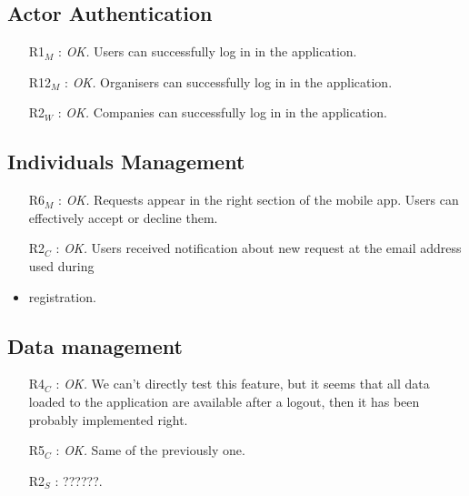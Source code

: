 \documentclass{article}
\begin{document}
\subsection{Actor Authentication}
\begin{itemize}
	\item [R1$_M$]: \textit{OK.} Users can successfully log in in the application.
	\item [R12$_M$]: \textit{OK.} Organisers can successfully log in in the application.
	\item [R2$_W$]: \textit{OK.} Companies  can successfully log in in the application.
\end{itemize}

\subsection{Individuals Management}
\begin{itemize}
	\item [R6$_M$]: \textit{OK.} Requests appear in the right section of the mobile app. Users can effectively accept or decline them.
	\item [R2$_C$]: \textit{OK.} Users received notification about new request at the email address used during 
	\item registration.
\end{itemize}

\subsection{Data management}
\begin{itemize}
	\item [R4$_C$]: \textit{OK.} We can't directly test this feature, but it seems that all data loaded to the application are available after a logout, then it has been probably implemented right.
	\item [R5$_C$]: \textit{OK.} Same of the previously one.
	\item [R2$_S$]: ??????.
\end{itemize}
\end{document}
